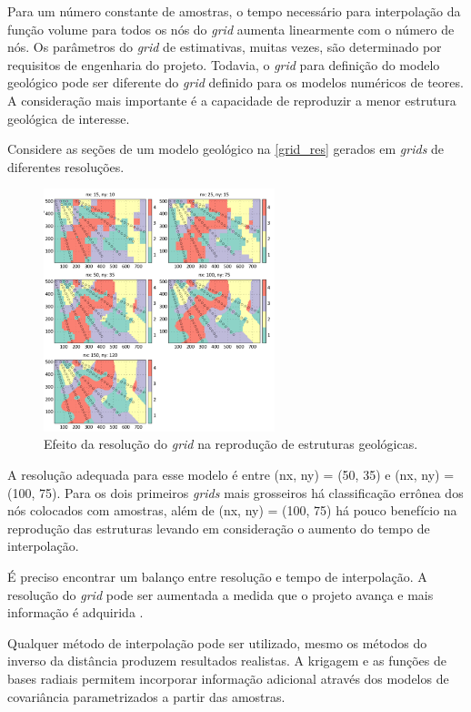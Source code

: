 Para um número constante de amostras, o tempo necessário para interpolação da função volume para todos os nós do \textit{grid} aumenta linearmente com o número de nós. Os parâmetros do \textit{grid} de estimativas, muitas vezes, são determinado por requisitos de engenharia do projeto. Todavia, o \textit{grid} para definição do modelo geológico pode ser diferente do \textit{grid} definido para os modelos numéricos de teores. A consideração mais importante é a capacidade de reproduzir a menor estrutura geológica de interesse.

Considere as seções de um modelo geológico na \autoref{grid_res} gerados em \textit{grids} de diferentes resoluções.

\begin{figure}[H]
	\centering
	\caption{\label{grid_res}Efeito da resolução do \textit{grid} na reprodução de estruturas geológicas.}
	\includegraphics[width=0.6\textwidth]{capitulo_2/imagens/grid_res.png}
\end{figure}

A resolução adequada para esse modelo é entre (nx, ny) = (50, 35) e (nx, ny) = (100, 75). Para os dois primeiros \textit{grids} mais grosseiros há classificação errônea dos nós colocados com amostras, além de (nx, ny) = (100, 75) há pouco benefício na reprodução das estruturas levando em consideração o aumento do tempo de interpolação.

É preciso encontrar um balanço entre resolução e tempo de interpolação. A resolução do \textit{grid} pode ser aumentada a medida que o projeto avança e mais informação é adquirida \cite{martin2017implicitmodeling}.

Qualquer método de interpolação pode ser utilizado, mesmo os métodos do inverso da distância produzem resultados realistas. A krigagem e as funções de bases radiais permitem incorporar informação adicional através dos modelos de covariância parametrizados a partir das amostras.

